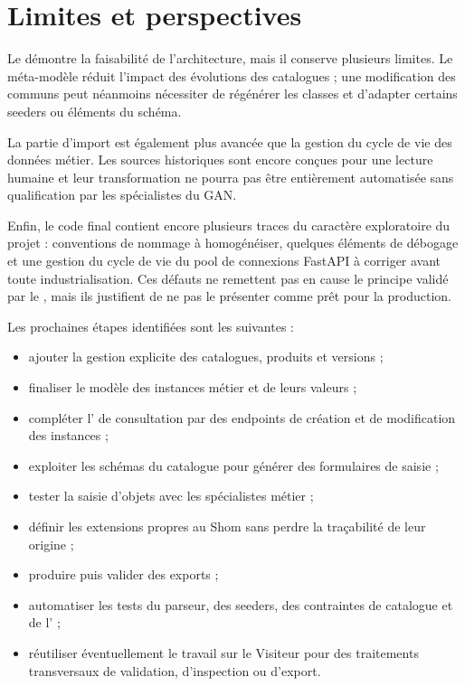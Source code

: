 \section{Limites et perspectives}

Le  démontre la faisabilité de l'architecture, mais il conserve plusieurs limites. Le méta-modèle réduit l'impact des évolutions des catalogues ; une modification des  communs peut néanmoins nécessiter de régénérer les classes et d'adapter certains seeders ou éléments du schéma.

La partie d'import est également plus avancée que la gestion du cycle de vie des données métier. Les sources historiques sont encore conçues pour une lecture humaine et leur transformation ne pourra pas être entièrement automatisée sans qualification par les spécialistes du GAN.

Enfin, le code final contient encore plusieurs traces du caractère exploratoire du projet : conventions de nommage à homogénéiser, quelques éléments de débogage et une gestion du cycle de vie du pool de connexions FastAPI à corriger avant toute industrialisation. Ces défauts ne remettent pas en cause le principe validé par le , mais ils justifient de ne pas le présenter comme prêt pour la production.

Les prochaines étapes identifiées sont les suivantes :

\begin{itemize}
    \item ajouter la gestion explicite des catalogues, produits et versions ;
    \item finaliser le modèle des instances métier et de leurs valeurs ;
    \item compléter l' de consultation par des endpoints de création et de modification des instances ;
    \item exploiter les schémas du catalogue pour générer des formulaires de saisie ;
    \item tester la saisie d'objets  avec les spécialistes métier ;
    \item définir les extensions propres au Shom sans perdre la traçabilité de leur origine ;
    \item produire puis valider des exports  ;
    \item automatiser les tests du parseur, des seeders, des contraintes de catalogue et de l' ;
    \item réutiliser éventuellement le travail sur le Visiteur pour des traitements transversaux de validation, d'inspection ou d'export.
\end{itemize}


